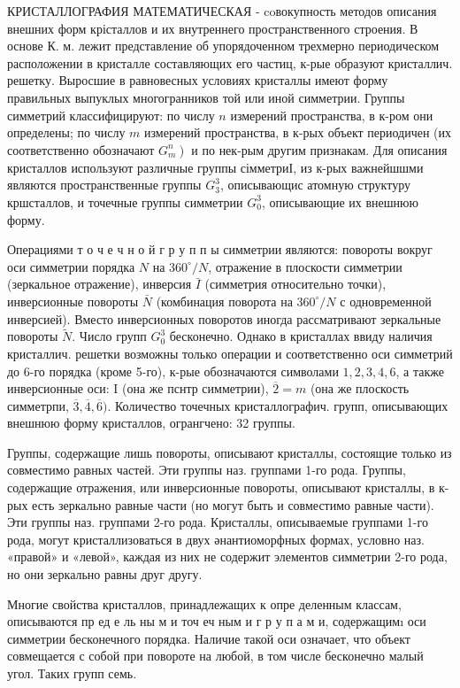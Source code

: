 \documentclass[10pt]{article}
\begin{document}
КРИСТАЛЛОГРАФИЯ МАТЕМАТИЧЕСКАЯ - coвокупность методов описания внешних форм крісталлов и их внутреннего пространственного строения. В основе К. м. лежит представление об упорядоченном трехмерно периодическом расположении в кристалле составляющих его частиц, к-рые образуют кристаллич. решетку. Выросшие в равновесных условиях кристаллы имеют форму правильных выпуклых многогранников той или иной симметрии. Группы симметрий классифицируют: по числу $n$ измерений пространства, в к-ром они определены; по числу $m$ измерений пространства, в к-рых объект периодичен (их соответственно обозначают $\left.G_{m}^{n}\right)$ и по нек-рым другим признакам. Для описания кристаллов используют различные группы сімметриІ, из к-рых важнейшшми являются пространственные группы $G_{3}^{3}$, описывающис атомную структуру кршсталлов, и точечные группы симметрии $G_{0}^{3}$, описывающие их внешнюю форму.



Операциями т о ч е ч н о й г р у п п ы симметрии являются: повороты вокруг оси симметрии порядка $N$ на $360^{\circ} / N$, отражение в плоскости симметрии (зеркальное отражение), инверсия $\bar{I}$ (симметрия относительно точки), инверсионные повороты $\bar{N}$ (комбинация поворота на $360^{\circ} / N$ с одновременной инверсией). Вместо инверсионных поворотов иногда рассматривают зеркальные повороты $\tilde{N}$. Число групп $G_{0}^{3}$ бесконечно. Однако в кристаллах ввиду наличия кристаллич. решетки возможны только операции и соответственно оси симметрий до 6-го порядка (кроме 5-го), к-рые обозначаются символами $1,2,3,4,6$, а также инверсионные оси: I (она же пснтр симметрии), $\overline{2}=m$ (она же плоскость симметрпи, $\overline{3}, \overline{4}, \overline{6})$. Количество точечных кристаллографич. групп, описывающих внешнюю форму кристаллов, огрангчено: 32 группы.



Группы, содержащие лишь повороты, описывают кристаллы, состоящие только из совместимо равных частей. Эти группы наз. группами 1-го рода. Группы, содержащие отражения, или инверсионные повороты, описывают кристаллы, в к-рых есть зеркально равные части (но могут быть и совместимо равные части). Эти группы наз. группами 2-го рода. Кристаллы, описываемые группами 1-го рода, могут кристаллизоваться в двух әнантиоморфных формах, условно наз. «правой» и «левой», каждая из них не содержит элементов симметрии 2-го рода, но они зеркально равны друг другу.



Многие свойства кристаллов, принадлежащих к опре деленным классам, описываются пр ед е ль ны м и точ еч ным и г р у п а м и, содержащимı оси симметрии бесконечного порядка. Наличие такой оси означает, что объект совмещается с собой при повороте на любой, в том числе бесконечно малый угол. Таких групп семь.
\end{document}
